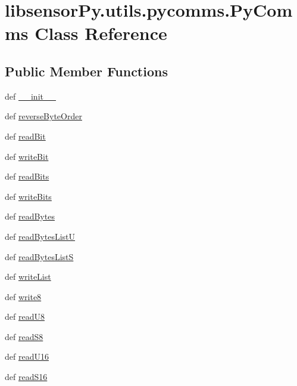 \hypertarget{classlibsensorPy_1_1utils_1_1pycomms_1_1PyComms}{}\section{libsensor\+Py.\+utils.\+pycomms.\+Py\+Comms Class Reference}
\label{classlibsensorPy_1_1utils_1_1pycomms_1_1PyComms}
\subsection*{Public Member Functions}
\begin{DoxyCompactItemize}
\item 
def \hyperlink{classlibsensorPy_1_1utils_1_1pycomms_1_1PyComms_af9a6512c6afdbd735cb40ae1b60800a3}{\+\_\+\+\_\+init\+\_\+\+\_\+}
\item 
def \hyperlink{classlibsensorPy_1_1utils_1_1pycomms_1_1PyComms_a08663673ceceeaed4cbcd320dc84f8e9}{reverse\+Byte\+Order}
\item 
def \hyperlink{classlibsensorPy_1_1utils_1_1pycomms_1_1PyComms_af25626e12567257a343f5d118e5d93d5}{read\+Bit}
\item 
def \hyperlink{classlibsensorPy_1_1utils_1_1pycomms_1_1PyComms_afc9ab63a45a263baba4341a98172d215}{write\+Bit}
\item 
def \hyperlink{classlibsensorPy_1_1utils_1_1pycomms_1_1PyComms_a183b6cf9fce23d1bff309143c9a83078}{read\+Bits}
\item 
def \hyperlink{classlibsensorPy_1_1utils_1_1pycomms_1_1PyComms_a913a4f818db267d1ffe177f9e9e715be}{write\+Bits}
\item 
def \hyperlink{classlibsensorPy_1_1utils_1_1pycomms_1_1PyComms_a429ca2ab439d896d60070db0a8de4fae}{read\+Bytes}
\item 
def \hyperlink{classlibsensorPy_1_1utils_1_1pycomms_1_1PyComms_a393b4e6a70e46babef50933cf8fb9ad9}{read\+Bytes\+List\+U}
\item 
def \hyperlink{classlibsensorPy_1_1utils_1_1pycomms_1_1PyComms_a51dfea7415e6549755c55a659a4bcae7}{read\+Bytes\+List\+S}
\item 
def \hyperlink{classlibsensorPy_1_1utils_1_1pycomms_1_1PyComms_aaedac13e919fa610ae87411aa4eb7672}{write\+List}
\item 
def \hyperlink{classlibsensorPy_1_1utils_1_1pycomms_1_1PyComms_a291d842e25a4fe16a9edc6f9ba0f7d3b}{write8}
\item 
def \hyperlink{classlibsensorPy_1_1utils_1_1pycomms_1_1PyComms_a1fa7ff82bfbc1dd4e2e5ae85fb9a68ef}{read\+U8}
\item 
def \hyperlink{classlibsensorPy_1_1utils_1_1pycomms_1_1PyComms_a5ccc93ca1861f9c3c250a2ebbde6234a}{read\+S8}
\item 
def \hyperlink{classlibsensorPy_1_1utils_1_1pycomms_1_1PyComms_a163227324d07482bc9626f76d35ae3d2}{read\+U16}
\item 
def \hyperlink{classlibsensorPy_1_1utils_1_1pycomms_1_1PyComms_ab869530bd40f8ec742764be54178f0d8}{read\+S16}
\end{DoxyCompactItemize}
